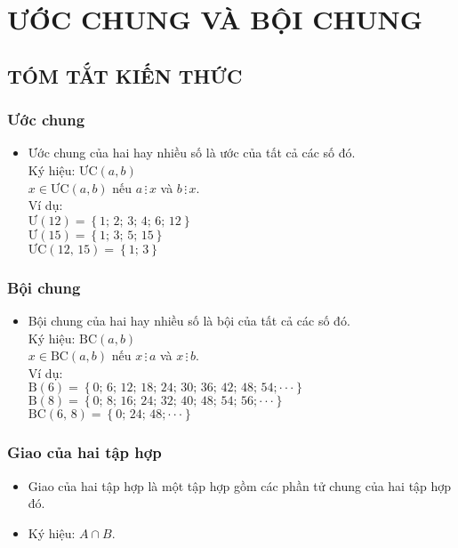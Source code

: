 \section{ƯỚC CHUNG VÀ BỘI CHUNG}
\subsection{TÓM TẮT KIẾN THỨC}
\begin{tomtat}
	\subsubsection{Ước chung}
\begin{itemize}
\item Ước chung của hai hay nhiều số là ước của tất cả các số đó.\\
Ký hiệu: $\text{ƯC}\left( {a,b} \right)$\\
$x \in \text{ƯC}\left( {a,b} \right)$ nếu $a \, \vdots \,x$ và $b \,\vdots\, x$.\\
Ví dụ: \\
$\text{Ư}\left( {12} \right) = \left\{ {1;\,2;\,3;\,4;\,6;\,12} \right\}$\\
$\text{Ư}\left( {15} \right) = \left\{ {1;\,3;\,5;\,15} \right\}$\\
$\text{ƯC}\left( {12,\,15} \right) = \left\{ {1;\,3} \right\}$
\end{itemize}
	\subsubsection{Bội chung}
\begin{itemize}
\item Bội chung của hai hay nhiều số là bội của tất cả các số đó.\\
Ký hiệu: $\text{BC}\left( {a,b} \right)$\\
$x \in \text{BC}\left( {a,b} \right)$ nếu $x \,\vdots\, a$ và $x \,\vdots \,b$.\\
Ví dụ: \\
$\text{B}\left( {6} \right) = \left\{ {0;\,6;\,12;\,18;\,24;\,30;\,36;\,42;\,48;\,54;\cdot \cdot \cdot} \right\}$\\
$\text{B}\left( {8} \right) = \left\{ {0;\,8;\,16;\,24;\,32;\,40;\,48;\,54;\,56;\cdot \cdot \cdot} \right\}$\\
$\text{BC}\left( {6,\,8} \right) = \left\{ {0;\,24;\,48;\cdot \cdot \cdot} \right\}$
\end{itemize}
	\subsubsection{Giao của hai tập hợp}
\begin{itemize}
\item Giao của hai tập hợp là một tập hợp gồm các phần tử chung của hai tập hợp đó.
\item Ký hiệu: $A \cap B$.\\


\end{itemize}
\end{tomtat}
